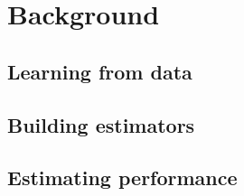 \chapter{Background}\label{ch:background}

\section{Learning from data}


\section{Building estimators}


\section{Estimating performance}


\lipsum[1]
